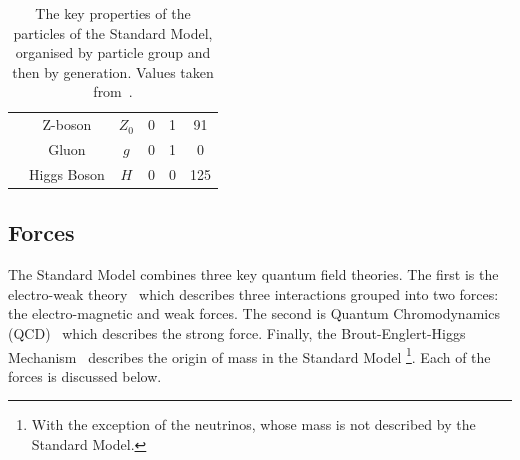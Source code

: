 {\begin{table}[!ht]
\begin{center}
\begin{tabular}{|c|c||c|c|c|c|}
                            &Z-boson          &   $Z_0$       &  0      &  1     &  91\\
                            &Gluon            &   $g$         &  0      &  1     &  0 \\
                            &Higgs Boson      &   $H$         &  0      &  0     &  125\\
    \hline  
    \end{tabular} 
  \caption[The key properties of the particles of the Standard Model]
          {The key properties of the particles of the Standard Model, organised by particle group and then by generation.
            Values taken from~\cite{obj-bjets_PDG}.}
  \label{tab:theo-sm_particles}
  \end{center}
  \end{table}}
  \vspace{-1em}

\subsection{Forces}
\label{sec:theo-sm_forces}

The Standard Model combines three key quantum field theories.
The first is the electro-weak theory~\cite{theo-glashow}
which describes three interactions grouped into two forces: the electro-magnetic and weak forces.
The second is Quantum Chromodynamics (QCD)~\cite{theo-qcd} which describes the strong force.
Finally, the Brout-Englert-Higgs Mechanism~\cite{theo-be,theo-higgs} describes the origin of mass in the Standard Model
\footnote{With the exception of the neutrinos, whose mass is not described by the Standard Model.}.
Each of the forces is discussed below.

